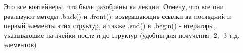 \documentclass[a4paper,12pt]{article}
\begin{document}
Это все контейнеры, что были разобраны на лекции. Отмечу, что все они реализуют методы
.back() и .front(), возвращающие ссылки на последний и первый элементы этих структур,
а также .end() и .begin() - итераторы, указывающие на ячейки после и до структур (удобны
для получения -2, -3 т.д. элементов).
\end{document}
